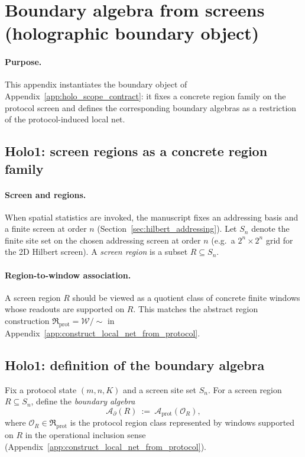 \section{Boundary algebra from screens (holographic boundary object)}
\label{app:holo_boundary_algebra_from_screens}

\paragraph{Purpose.}
\AuditTag This appendix instantiates the boundary object of Appendix~\ref{app:holo_scope_contract}:
it fixes a concrete region family on the protocol screen and defines the corresponding boundary algebras
as a restriction of the protocol-induced local net.

\subsection{Holo1: screen regions as a concrete region family}
\label{subsec:holo1_screen_regions}

\paragraph{Screen and regions.}
\InterfaceTag When spatial statistics are invoked, the manuscript fixes an addressing basis and a finite screen
at order $n$ (Section~\ref{sec:hilbert_addressing}).
Let $S_n$ denote the finite site set on the chosen addressing screen at order $n$
(e.g.\ a $2^n\times 2^n$ grid for the 2D Hilbert screen).
A \emph{screen region} is a subset $R\subseteq S_n$.

\paragraph{Region-to-window association.}
\AuditTag A screen region $R$ should be viewed as a quotient class of concrete finite windows whose readouts
are supported on $R$.
This matches the abstract region construction $\mathfrak{R}_{\mathrm{prot}}=\mathcal{W}/\sim$
in Appendix~\ref{app:construct_local_net_from_protocol}.

\subsection{Holo1: definition of the boundary algebra}
\label{subsec:holo1_boundary_algebra_def}

\begin{definition}
\label{def:holo_boundary_algebra}
\MathTag Fix a protocol state $(m,n,K)$ and a screen site set $S_n$.
For a screen region $R\subseteq S_n$, define the \emph{boundary algebra}
\[
\mathcal{A}_{\partial}(R)\ :=\ \mathcal{A}_{\mathrm{prot}}(\mathcal{O}_R),
\]
where $\mathcal{O}_R\in\mathfrak{R}_{\mathrm{prot}}$ is the protocol region class represented by windows supported on $R$
in the operational inclusion sense (Appendix~\ref{app:construct_local_net_from_protocol}).
\end{definition}

